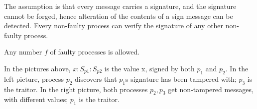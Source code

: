 \documentclass[a4paper]{article}
\begin{document}
{  The assumption is that every message carries a signature, and the
  signature cannot be forged, hence alteration of the contents of a
  sign message can be detected. Every non-faulty process can verify
  the signature of any other non-faulty process.

  Any number $f$ of faulty processes is allowed.

  \begin{minipage}{0.45\linewidth}
  \end{minipage}
  \begin{minipage}{0.45\linewidth}
  \end{minipage}

  In the pictures above, $x:S_{p1}:S_{p2}$ is the value x, signed by
  both $p_1$ and $p_2$. In the left picture, process $p_2$ discovers
  that $p_1$s signature has been tampered with; $p_3$ is the traitor.
  In the right picture, both processes $p_2, p_3$ get non-tampered
  messages, with different values; $p_1$ is the traitor.
}
\end{document}

